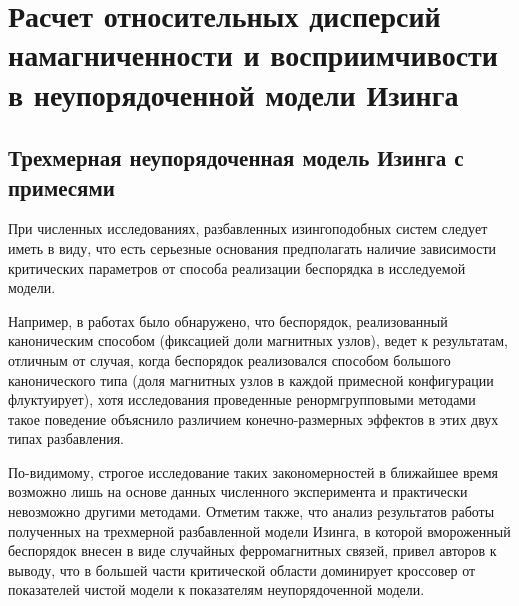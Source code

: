 
\section{Расчет относительных дисперсий намагниченности и восприимчивости в неупорядоченной модели Изинга}




%
%




\subsection{Трехмерная неупорядоченная модель Изинга с примесями}

При численных исследованиях, разбавленных изингоподобных систем следует иметь в виду, что есть серьезные основания предполагать наличие зависимости критических параметров от способа реализации беспорядка в исследуемой модели.

Например, в работах \cite{ph2_1, ph2_2} было обнаружено, что беспорядок, реализованный каноническим способом (фиксацией доли магнитных узлов), ведет к результатам, отличным от случая, когда беспорядок реализовался способом большого канонического типа (доля магнитных узлов в каждой примесной конфигурации флуктуирует), хотя исследования \cite{ph2_3} проведенные ренормгрупповыми методами такое поведение объяснило различием конечно-размерных эффектов в этих двух типах разбавления.

По-видимому, строгое исследование таких закономерностей в ближайшее время возможно лишь на основе данных численного эксперимента и практически невозможно другими методами. Отметим также, что анализ результатов работы \cite{ph2_4} полученных на трехмерной разбавленной модели Изинга, в которой вмороженный беспорядок внесен в виде случайных ферромагнитных связей, привел авторов к выводу, что в большей части критической области доминирует кроссовер от показателей чистой модели к показателям неупорядоченной модели.

